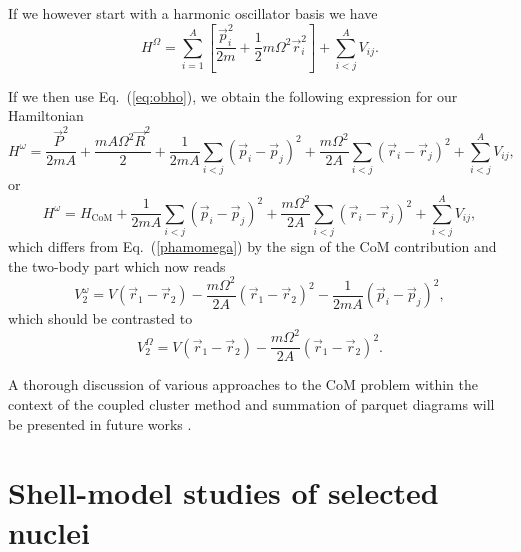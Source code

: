 \documentclass{article}
\begin{document}
If we however start with a harmonic oscillator basis we
have
\begin{equation}
H^\Omega=\sum_{i=1}^A \left[ \frac{\vec{p}_i^2}{2m}
+\frac{1}{2}m\Omega^2 \vec{r}^2_i
\right] + \sum_{i<j}^A V_{ij}.
\label{newho}
\end{equation}

If we then use Eq.~(\ref{eq:obho}), we obtain the following expression
for our Hamiltonian
\begin{equation}
H^\omega=\frac{\vec{P}^2}{2mA}+\frac{mA\Omega^2\vec{R}^2}{2}
           +\frac{1}{2mA}\sum_{i<j}(\vec{p}_i-\vec{p}_j)^2
           +\frac{m\Omega^2}{2A}\sum_{i<j}(\vec{r}_i-\vec{r}_j)^2
           + \sum_{i<j}^A V_{ij},
\end{equation}
or 
\begin{equation}
H^\omega=H_{\mathrm{CoM}}
           +\frac{1}{2mA}\sum_{i<j}(\vec{p}_i-\vec{p}_j)^2
           +\frac{m\Omega^2}{2A}\sum_{i<j}(\vec{r}_i-\vec{r}_j)^2
           + \sum_{i<j}^A V_{ij},
\end{equation}
which differs from Eq.~(\ref{phamomega}) by the sign of the CoM contribution
and the two-body part which now reads
\begin{equation}
V_2^\omega=V(\vec{r}_1-\vec{r}_2)-\frac{m\Omega^2}{2A}(\vec{r}_1-\vec{r}_2)^2
-\frac{1}{2mA}(\vec{p}_i-\vec{p}_j)^2,
\end{equation}
which should be contrasted to 
\[
   V_2^\Omega=V(\vec{r}_1-\vec{r}_2)-\frac{m\Omega^2}{2A}(\vec{r}_1-\vec{r}_2)^2.
\]

A thorough discussion of various approaches to the CoM problem within the context of the 
coupled cluster method and summation of parquet diagrams will be presented in future 
works \cite{dean04}.




\section{Shell-model studies of selected nuclei}\label{sec:sec4}
\end{document}
